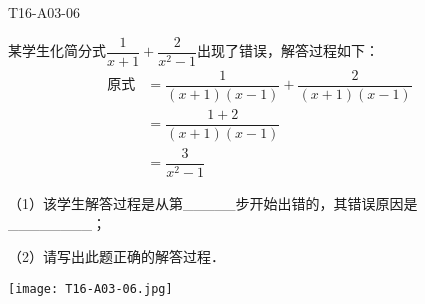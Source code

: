 \begin{defproblem}{T16-A03-06}%
\begin{onlyproblem}%
某学生化简分式$\dfrac{1}{x+1}+\dfrac{2}{x^2-1}$出现了错误，解答过程如下：
\begin{align*}
\text{原式}&=\dfrac{1}{(x+1)(x-1)}+\dfrac{2}{(x+1)(x-1)}\tag*{第一步}\\ 
&=\dfrac{1+2}{(x+1)(x-1)}\tag*{第二步}\\ 
&=\dfrac{3}{x^2-1}\tag*{第三步} 
\end{align*}

（1）该学生解答过程是从第{\_}{\_}{\_}{\_}{\_}步开始出错的，其错误原因是{\_}{\_}{\_}{\_}{\_}{\_}{\_}{\_}；

（2）请写出此题正确的解答过程．
\end{onlyproblem}%
\begin{onlysolution}%
\begin{center}
\texttt{[image: T16-A03-06.jpg]}
\end{center}
\end{onlysolution}%
\end{defproblem}

